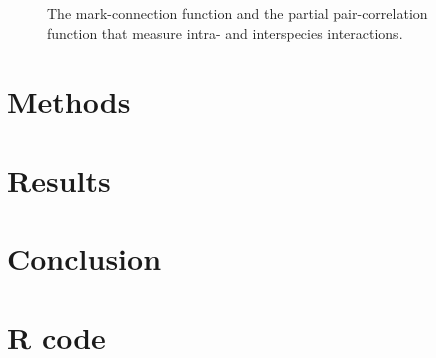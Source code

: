 \documentclass[12pt,a4paper,oneside,article]{memoir}
\begin{document}
\begin{figure}[htb]
  \begin{adjustwidth}{-2in}{-2in}
	  \centering
  \end{adjustwidth}
  \caption{The mark-connection function and the partial pair-correlation function that measure intra- and interspecies interactions.}
\end{figure}

\clearpage

\section{Methods}

\section{Results}

\section{Conclusion}


\printbibliography
\clearpage
\appendix
\section*{R code}


\end{document}
